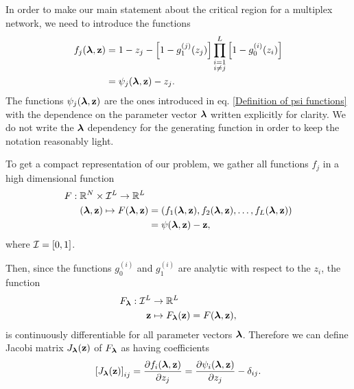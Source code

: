 \documentclass[
11pt, %
english, %
singlespacing, %
nolistspacing, %
liststotoc, %
headsepline, %
]{MastersDoctoralThesis} %
\begin{document}
In order to make our main statement about the critical region for a multiplex network, we need to introduce the functions
\begin{align}
	f_j(\boldsymbol{\mathrm{\lambda}}, \boldsymbol{\mathrm{z}}) &= 1 - z_j - \left[1 - g_1^{(j)}(z_j) \right] \prod_{\substack{i = 1 \\ i \neq j}}^{L}  \left[1 - g_0^{(i)}(z_i) \right] \label{Definition fj} \\
		&= \psi_j(\boldsymbol{\mathrm{\lambda}}, \boldsymbol{\mathrm{z}}) - z_j.
\end{align}
The functions $\psi_j(\boldsymbol{\mathrm{\lambda}}, \boldsymbol{\mathrm{z}})$ are the ones introduced in eq. \eqref{Definition of psi functions} with the dependence on the parameter vector $\boldsymbol{\mathrm{\lambda}}$ written explicitly for clarity. We do not write the $\boldsymbol{\mathrm{\lambda}}$ dependency for the generating function in order to keep the notation reasonably light.

To get a compact representation of our problem, we gather all functions $f_j$ in a high dimensional function
\begin{align}
	F : \; &\mathbb{R}^N \times \unitinterval^L \rightarrow \mathbb{R}^L\\
	&(\lambdavec, \zvec) \mapsto F(\lambdavec, \zvec) = (f_1(\lambdavec, \zvec), f_2(\lambdavec, \zvec), \dots, f_L(\lambdavec, \zvec)) \label{Definition F} \\
		&\hphantom{(\lambdavec, \zvec) \mapsto F(\lambdavec, \zvec)} = \psi(\lambdavec, \zvec) - \zvec,
\end{align}
where $\mathcal{I} = [0, 1]$.

Then, since the functions $g_0^{(i)}$ and $g_1^{(i)}$ are analytic with respect to the $z_i$, the function
\begin{align}
	F_{\boldsymbol{\mathrm{\lambda}}} : \mathcal{I}^L &\rightarrow \mathbb{R}^L\\
		\boldsymbol{\mathrm{z}} &\mapsto F_{\boldsymbol{\mathrm{\lambda}}}(\boldsymbol{\mathrm{z}}) = F(\boldsymbol{\mathrm{\lambda}}, \boldsymbol{\mathrm{z}}),
\end{align}
is continuously differentiable for all parameter vectors $\boldsymbol{\mathrm{\lambda}}$. Therefore we can define Jacobi matrix $J_{\boldsymbol{\mathrm{\lambda}}}(\boldsymbol{\mathrm{z}})$ of $F_{\boldsymbol{\mathrm{\lambda}}}$ as having coefficients
\begin{align}
	\left[ J_{\boldsymbol{\mathrm{\lambda}}}(\boldsymbol{\mathrm{z}}) \right]_{ij} = \frac{\partial f_i(\boldsymbol{\mathrm{\lambda}},\boldsymbol{\mathrm{z}})}{\partial z_j} = \frac{\partial \psi_i(\boldsymbol{\mathrm{\lambda}},\boldsymbol{\mathrm{z}})}{\partial z_j} - \delta_{ij}.
\end{align}
\end{document}
